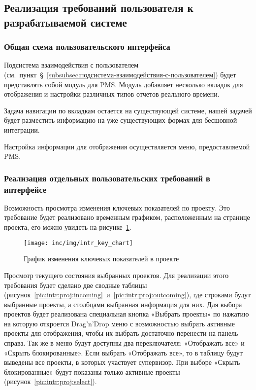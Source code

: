 \subsection{Реализация требований пользователя к разрабатываемой системе}

\subsubsection{Общая схема пользовательского интерфейса}

Подсистема взаимодействия с пользователем (см.~пункт~\S~\ref{subsubsec:подсистема-взаимодействия-с-пользователем})
будет представлять собой модуль для PMS\@.
Модуль добавляет несколько вкладок для отображения и настройки различных
типов отчетов реального времени.

Задача навигации по вкладкам остается на существующей системе,
нашей задачей будет разместить информацию на уже существующих формах для бесшовной интеграции.

Настройка информации для отображения осуществляется меню, предоставляемой PMS\@.

\subsubsection{Реализация отдельных пользовательских требований в интерфейсе}

Возможность просмотра изменения ключевых показателей по проекту.
Это требование будет реализовано временным графиком, расположенным на странице проекта, его можно увидеть на рисунке~\ref{pic:intr:proj:keyval}.

\begin{figure}[!ht]
    \centering
    \texttt{[image: inc/img/intr\_key\_chart]}
    \caption{График изменения ключевых показателей в проекте}
    \label{pic:intr:proj:keyval}
\end{figure}

Просмотр текущего состояния выбранных проектов.
Для реализации этого требования будет сделано две сводные таблицы (рисунок~\ref{pic:intr:proj:incoming}~и~\ref{pic:intr:proj:outcoming}),
где строками будут выбранные проекты, а столбцами выбранная информация для них.
Для выбора проектов будет реализована специальная кнопка «Выбрать проекты»
по нажатию на которую откроется Drag’n’Drop
меню с возможностью
выбрать активные проекты для отображения,
чтобы их выбрать достаточно перенести на панель справа.
Так же в меню будут доступны два переключателя:
«Отображать все» и «Скрыть блокированные».
Если выбрать «Отображать все», то в таблицу будут выведены все проекты,
в которых участвует супервизор.
При выборе «Скрыть блокированные» будут показаны только активные проекты (рисунок~\ref{pic:intr:proj:select}).

